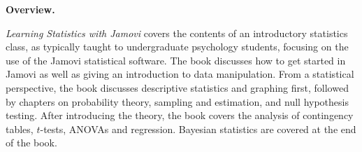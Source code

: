 

\clearpage
\newpage

\begin{center}
{\bf Overview.}
\end{center}

{\it Learning Statistics with Jamovi} covers the contents of an introductory statistics class, as typically taught to undergraduate psychology students, focusing on the use of the Jamovi statistical software. The book discusses how to get started in Jamovi as well as giving an introduction to data manipulation. From a statistical perspective, the book discusses descriptive statistics and graphing first, followed by chapters on probability theory, sampling and estimation, and null hypothesis testing. After introducing the theory, the book covers the analysis of contingency tables, $t$-tests, ANOVAs and regression. Bayesian statistics are covered at the end of the book. 

